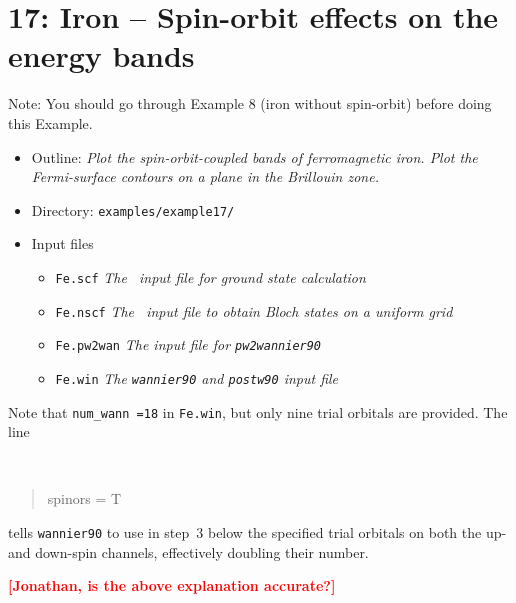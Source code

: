 \documentclass[a4paper,11pt,twoside]{article}
\def\tent#1{\textcolor{red}{#1}}     %
\begin{document}

\cleardoublepage


\section*{17: Iron -- Spin-orbit effects on the energy bands}

Note: You should go through Example 8 (iron without spin-orbit) before
doing this Example.
\begin{itemize}
\item{Outline: \it{Plot the spin-orbit-coupled bands of ferromagnetic
      iron.  Plot the Fermi-surface contours on a plane in the
      Brillouin zone.}}
\item{Directory: {\tt examples/example17/}}
\item{Input files}
\begin{itemize}
\item{ {\tt Fe.scf} {\it The \pwscf\ input file for ground state
    calculation}}
\item{ {\tt Fe.nscf}  {\it The \pwscf\ input file to obtain Bloch
    states on a uniform grid}} 
\item{ {\tt Fe.pw2wan}  {\it The input file for {\tt pw2wannier90}}}
\item{ {\tt Fe.win}  {\it The {\tt wannier90} and {\tt postw90} input file}}
\end{itemize}
\end{itemize}

Note that {\tt num\_wann =18} in {\tt Fe.win}, but only nine trial
orbitals are provided. The line
  {\tt
\begin{quote}
spinors = T
\end{quote}
}tells {\tt wannier90} to use in step~3 below the specified trial
orbitals on both the up- and down-spin channels, effectively doubling
their number.

\tent{\bf [Jonathan, is the above explanation accurate?]}
\end{document}
